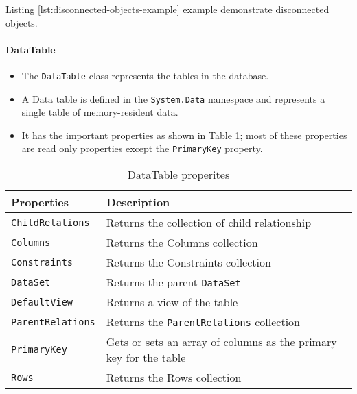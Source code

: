 \noindent Listing \ref{lst:disconnected-objects-example} example demonstrate disconnected objects.




\paragraph*{DataTable}
\begin{itemize}
	\item The \texttt{DataTable} class represents the tables in the database. 
	\item A Data table is defined in the \texttt{System.Data} namespace and represents a single table of memory-resident data.
	\item It has the important properties as shown in Table \ref{tab:data-table-prop}; most of these properties are read only properties except the \texttt{PrimaryKey} property.
\end{itemize}


\begin{table}[ht!]
\centering	
	\caption{DataTable properites}\label{tab:data-table-prop}
\begin{tabular}{p{3cm}p{9cm}}
	\toprule
	\textbf{Properties}    & \textbf{Description}                                              \\ \midrule
	\verb|ChildRelations|  & Returns the collection of child relationship                      \\
	\verb|Columns|         & Returns the Columns collection                                    \\
	\verb|Constraints|     & Returns the Constraints collection                                \\
	\verb|DataSet|         & Returns the parent \texttt{DataSet}                                        \\
	\verb|DefaultView|     & Returns a view of the table                                       \\
	\verb|ParentRelations| & Returns the \texttt{ParentRelations} collection                            \\
	\verb|PrimaryKey|      & Gets or sets an array of columns as the primary key for the table \\
	\verb|Rows|            & Returns the Rows collection                                       \\ \bottomrule
\end{tabular}
\end{table}

